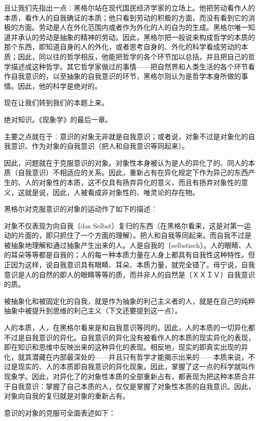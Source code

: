 \documentclass[a4paper,twoside,12pt]{ctexart}
\begin{document}
且让我们先指出一点︰黑格尔站在现代国民经济学家的立场上。他把劳动看作人的本质，看作人的自我确证的本质；他只看到劳动的积极的方面，而没有看到它的消极的方面。劳动是人在外化范围内或者作为外化的人的自为的生成。黑格尔唯一知道并承认的劳动是抽象的精神的劳动。因此，黑格尔把一般说来构成哲学的本质的那个东西，即知道自身的人的外化，或者思考自身的、外化的科学看成劳动的本质；因此，同以往的哲学相反，他能把哲学的各个环节加以总括，并且把自己的哲学描述成这种哲学。其它哲学家做过的事情——把自然界和人类生活的各个环节看作自我意识的，以至抽象的自我意识的环节，黑格尔则认为是哲学本身所做的事情。因此，他的科学是绝对的。

现在让我们转到我们的本题上来。

绝对知识。《现象学》的最后一章。

主要之点就在于︰意识的对象无非就是自我意识；或者说，对象不过是对象化的自我意识、作为对象的自我意识（把人和自我意识等同起来）。

因此，问题就在于克服意识的对象。对象性本身被认为是人的异化了的、同人的本质（自我意识）不相适应的关系。因此，重新占有在异化规定下作为异己的东西产生的、人的对象性的本质，这不仅具有扬弃异化的意义，而且有扬弃对象性的意义，这就是说，因此，人被看成非对象性的、唯灵论的存在物。

黑格尔对克服意识的对象的运动作了如下的描述︰

对象不仅表现为向自我〔das Selbst〕复归的东西（在黑格尔看来，这是对第一运动的片面的，即只抓住了一个方面的理解）。把人和自我等同起来。而自我不过是被抽象地理解和通过抽象产生出来的人。人是自我的〔selbstisch〕。人的眼睛、人的耳朵等等都是自我的；人的每一种本质力量在人身上都具有自我性这种特性。但正因为这样，说自我意识具有眼睛、耳朵、本质力量，就完全错了。毋宁说，自我意识是人的自然的即人的眼睛等等的质，而并非人的自然是〔ＸＸＩＶ〕自我意识的质。

被抽象化和被固定化的自我，就是作为抽象的利己主义者的人，就是在自己的纯粹抽象中被提升到思维的利己主义（下文还要提到这一点）。

人的本质，人，在黑格尔看来是和自我意识等同的。因此，人的本质的一切异化都不过是自我意识的异化。自我意识的异化没有被看作人的本质的现实异化的表现，即在知识和思维中反映出来的这种异化的表现。相反地，现实的即真实出现的异化，就其潜藏在内部最深处的——并且只有哲学才能揭示出来的——本质来说，不过是现实的、人的本质即自我意识的异化现象。因此，掌握了这一点的科学就叫作现象学。因此，对异化了的对象性本质的全部重新占有，都表现为把这种本质合并于自我意识：掌握了自己本质的人，仅仅是掌握了对象性本质的自我意识。因此，对象向自我的复归就是对象的重新占有。

意识的对象的克服可全面表述如下：
\end{document}
